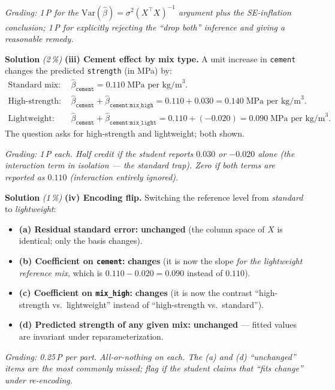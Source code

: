 \documentclass[11pt,a4paper]{article}
\newcommand{\subpoints}[1]{\textit{(#1\,\%)}}
\newcommand{\sol}{\noindent\textbf{Solution}}
\begin{document}
\noindent\emph{Grading: 1\,P for the $\mathrm{Var}(\hat\beta) = \sigma^2(X^\top X)^{-1}$ argument
plus the SE-inflation conclusion; 1\,P for explicitly rejecting the ``drop both'' inference and
giving a reasonable remedy.}

\medskip
\sol{} \subpoints{2} \textbf{(iii) Cement effect by mix type.}
A unit increase in \texttt{cement} changes the predicted \texttt{strength} (in MPa) by:
\begin{align*}
\text{Standard mix:}\quad &\hat\beta_{\texttt{cement}} = 0.110\;\text{MPa per kg/m}^3.\\
\text{High-strength:}\quad &\hat\beta_{\texttt{cement}} + \hat\beta_{\texttt{cement:mix\_high}}
   = 0.110 + 0.030 = \boxed{0.140}\;\text{MPa per kg/m}^3.\\
\text{Lightweight:}\quad &\hat\beta_{\texttt{cement}} + \hat\beta_{\texttt{cement:mix\_light}}
   = 0.110 + (-0.020) = \boxed{0.090}\;\text{MPa per kg/m}^3.
\end{align*}
The question asks for high-strength and lightweight; both shown.

\noindent\emph{Grading: 1\,P each. Half credit if the student reports $0.030$ or $-0.020$ alone
(the interaction term in isolation --- the standard trap). Zero if both terms are reported as
$0.110$ (interaction entirely ignored).}

\medskip
\sol{} \subpoints{1} \textbf{(iv) Encoding flip.} Switching the reference level from
\emph{standard} to \emph{lightweight}:
\begin{itemize}
  \item \textbf{(a) Residual standard error:} \textbf{unchanged} (the column space of $X$ is
        identical; only the basis changes).
  \item \textbf{(b) Coefficient on \texttt{cement}:} \textbf{changes} (it is now the slope
        \emph{for the lightweight reference mix}, which is $0.110-0.020 = 0.090$ instead of $0.110$).
  \item \textbf{(c) Coefficient on \texttt{mix\_high}:} \textbf{changes} (it is now the contrast
        ``high-strength vs.\ lightweight'' instead of ``high-strength vs.\ standard'').
  \item \textbf{(d) Predicted strength of any given mix:} \textbf{unchanged} --- fitted values are
        invariant under reparameterization.
\end{itemize}

\noindent\emph{Grading: 0.25\,P per part. All-or-nothing on each. The (a) and (d) ``unchanged''
items are the most commonly missed; flag if the student claims that ``fits change'' under
re-encoding.}
\end{document}
